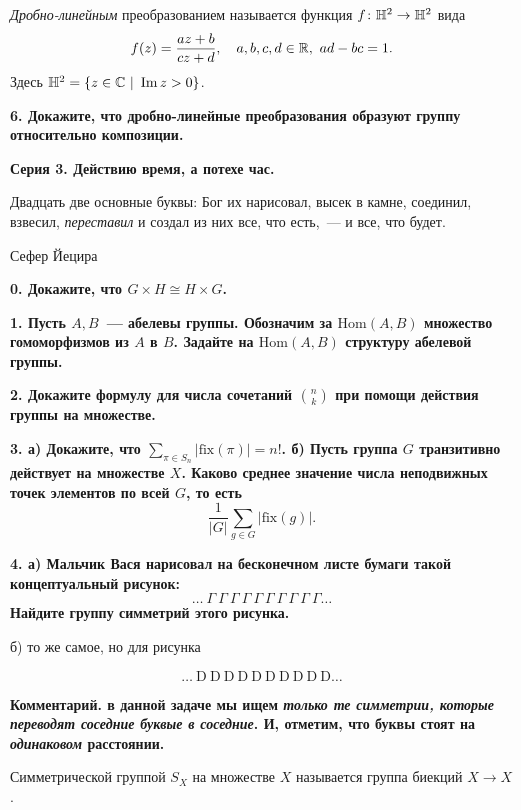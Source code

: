 \documentclass[10pt]{article}
\begin{document}
\begin{landscape}
\begin{multicols}{2}
	\begin{definition} 
		\emph{Дробно-линейным} преобразованием называется функция $f\colon \mathbb{H}^2 \to \mathbb{H}^2$ вида 
		\[
			f(z) = \frac{az + b}{cz + d}, \quad a, b, c, d \in \mathbb{R},\  ad - bc = 1.
		\]
		Здесь $\mathbb{H}^2 = \{ z \in \mathbb{C} \ \vert \ \mathop{\mathrm{Im}}\nolimits{z} > 0 \}$. 
	\end{definition}


	\bf{6.} Докажите, что дробно-линейные преобразования образуют группу относительно композиции.

	\columnbreak

	\centerline{\bf{Серия 3. Действию время, а потехе час. }}

	\epigraph{Двадцать две основные буквы: Бог их нарисовал, высек в камне, соединил, взвесил, \emph{переставил} и создал из них все, что есть,~--- и все, что будет.}{Сефер Йецира}

	\bf{0.} Докажите, что $G \times H \cong H \times G$.

	\bf{1.} Пусть $A, B$~--- абелевы группы. Обозначим за $\mathrm{Hom}(A, B)$ множество гомоморфизмов из $A$ в $B$. Задайте на $\mathrm{Hom}(A, B)$ структуру абелевой группы. 

	\bf{2.} Докажите формулу для числа сочетаний $\binom{n}{k}$ при помощи действия группы на множестве. 

	\bf{3.} а) Докажите, что $\sum_{\pi \in S_n} |\mathrm{fix}(\pi)| = n!$. б) Пусть группа $G$ транзитивно действует на множестве $X$. Каково среднее значение числа неподвижных точек элементов по всей $G$, то есть 
	\[
		\frac{1}{|G|}\sum_{g \in G} |\mathrm{fix}(g)|. 
	\]


	\bf{4.} а) Мальчик Вася нарисовал на бесконечном листе бумаги такой концептуальный рисунок: 
	\[
		\ldots \ \Gamma \ \Gamma \ \Gamma \ \Gamma \ \Gamma \ \Gamma \ \Gamma \ \Gamma \ \Gamma \ \Gamma \ldots
	\]
	Найдите группу симметрий этого рисунка. 

	б) то же самое, но для рисунка 

	\[
		\ldots \ \mathrm{D} \ \mathrm{D} \ \mathrm{D} \ \mathrm{D} \ \mathrm{D}\ \mathrm{D} \ \mathrm{D} \ \mathrm{D} \ \mathrm{D} \ \mathrm{D}\ldots
	\]

	\noindent\bf{Комментарий.} в данной задаче мы ищем \emph{только те симметрии, которые переводят соседние буквые в соседние}. И, отметим, что буквы стоят на \emph{одинаковом} расстоянии. 

	\begin{definition} 
		Симметрической группой $S_{X}$ на множестве $X$ называется группа биекций $X \to X$.
	\end{definition}


\end{multicols}
\end{landscape}
\end{document}
